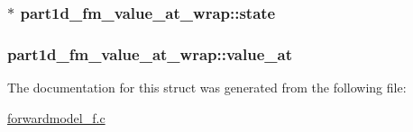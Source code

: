\subsubsection[{\texorpdfstring{state}{state}}]{$\ast$ part1d\+\_\+fm\+\_\+value\+\_\+at\+\_\+wrap\+::state}\hypertarget{structpart1d__fm__value__at__wrap_a94f89fa9972dde27d2b75543ae82d295}{}\label{structpart1d__fm__value__at__wrap_a94f89fa9972dde27d2b75543ae82d295}
\subsubsection[{\texorpdfstring{value\+\_\+at}{value_at}}]{ part1d\+\_\+fm\+\_\+value\+\_\+at\+\_\+wrap\+::value\+\_\+at}\hypertarget{structpart1d__fm__value__at__wrap_a3b289f35e7e55e2d91d9f889789f66d9}{}\label{structpart1d__fm__value__at__wrap_a3b289f35e7e55e2d91d9f889789f66d9}


The documentation for this struct was generated from the following file\+:\begin{DoxyCompactItemize}
\item 
\hyperlink{forwardmodel__f_8c}{forwardmodel\+\_\+f.\+c}\end{DoxyCompactItemize}
